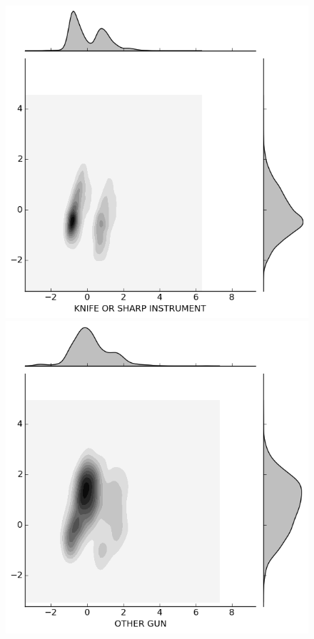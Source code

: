 \documentclass{evanarticle}
\begin{document}
\begin{figure}[H]
  \begin{minipage}[b]{0.20\linewidth}
    \includegraphics[width=\linewidth]{images/weapon/KNIFE.png}
  \end{minipage}
  \quad
  \begin{minipage}[b]{0.20\linewidth}
    \includegraphics[width=\linewidth]{images/weapon/OTHER_GUN.png}

\end{minipage}
\end{figure}
\end{document}
